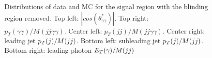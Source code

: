 \begin{figure}[thb]
  \caption{Distributions of data and MC for the signal region with the blinding region removed. Top left: $|cos(\theta^{*}_{\gamma\gamma})|$. Top right: $p_{T}(\gamma\gamma)/M(jj\gamma\gamma)$. Center left: $p_{T}(jj)/M(jj\gamma\gamma)$. Center right: leading jet $p_{T}(j)/M(jj)$. Bottom left: subleading jet $p_{T}(j)/M(jj)$. Bottom right: leading photon $E_{T}(\gamma)/M(jj)$}
\label{fig:cp_mgg4}
\end{figure}


